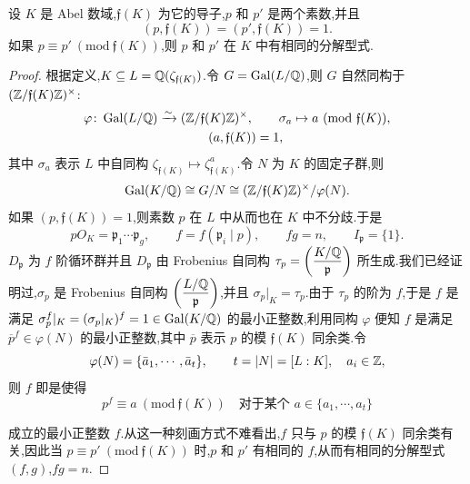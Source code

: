 \begin{theorem}\label{thm:2.18}
设 $K$ 是 Abel 数域,$\mathfrak{f}(K)$ 为它的导子,$p$ 和 $p'$ 是两个素数,并且
\[
  (p,\mathfrak{f}(K))=(p',\mathfrak{f}(K))=1.
\]
如果 $p\equiv p'\ (\mathrm{mod}\ \mathfrak{f}(K))$,则 $p$ 和 $p'$ 在 $K$ 中有相同的分解型式.
\end{theorem}

\begin{proof}
根据定义,$K\subseteq L=\mathbb{Q}(\zeta_{\mathfrak{f}(K)})$.令 $G=\operatorname{Gal}(L/\mathbb{Q})$,则 $G$ 自然同构于 $(\mathbb{Z}/\mathfrak{f}(K)\mathbb{Z})^\times$:
\begin{align*}
  \varphi\colon\operatorname{Gal}(L/\mathbb{Q})&\xrightarrow{\sim}(\mathbb{Z}/\mathfrak{f}(K)\mathbb{Z})^\times,\qquad
  \sigma_a\mapsto a\ (\mathrm{mod}\ \mathfrak{f}(K)),\\
  &\qquad\qquad (a,\mathfrak{f}(K))=1,
\end{align*}
其中 $\sigma_a$ 表示 $L$ 中自同构 $\zeta_{\mathfrak{f}(K)}\mapsto\zeta_{\mathfrak{f}(K)}^a$.令 $N$ 为 $K$ 的固定子群,则
\[
  \operatorname{Gal}(K/\mathbb{Q})\cong G/N\cong(\mathbb{Z}/\mathfrak{f}(K)\mathbb{Z})^\times/\varphi(N).
\]
如果 $(p,\mathfrak{f}(K))=1$,则素数 $p$ 在 $L$ 中从而也在 $K$ 中不分歧.于是
\[
  pO_K=\mathfrak{p}_1\cdots\mathfrak{p}_g,\qquad f=f(\mathfrak{p}_i\mid p),\qquad fg=n,\qquad I_{\mathfrak{p}}=\{1\}.
\]
$D_{\mathfrak{p}}$ 为 $f$ 阶循环群并且 $D_{\mathfrak{p}}$ 由 Frobenius 自同构 $\tau_p=\left(\dfrac{K/\mathbb{Q}}{\mathfrak{p}}\right)$ 所生成.我们已经证明过,$\sigma_p$ 是 Frobenius 自同构 $\left(\dfrac{L/\mathbb{Q}}{\mathfrak{p}}\right)$,并且 $\sigma_p|_K=\tau_p$.由于 $\tau_p$ 的阶为 $f$,于是 $f$ 是满足 $\sigma_p^f|_K=(\sigma_p|_K)^f=1\in\operatorname{Gal}(K/\mathbb{Q})$ 的最小正整数,利用同构 $\varphi$ 便知 $f$ 是满足 $\overline{p}^f\in\varphi(N)$ 的最小正整数,其中 $\overline{p}$ 表示 $p$ 的模 $\mathfrak{f}(K)$ 同余类.令
\[
  \varphi(N)=\{\bar{a}_1,\cdots,\bar{a}_t\},\qquad t=|N|=[L:K],\quad a_i\in\mathbb{Z},
\]
则 $f$ 即是使得
\[
  p^f\equiv a\ (\mathrm{mod}\ \mathfrak{f}(K))\quad \text{对于某个 }a\in\{a_1,\cdots,a_t\}
\]
\begin{sloppypar}
成立的最小正整数 $f$.从这一种刻画方式不难看出,$f$ 只与 $p$ 的模 $\mathfrak{f}(K)$ 同余类有关,因此当 $p\equiv p'\ (\mathrm{mod}\ \mathfrak{f}(K))$ 时,$p$ 和 $p'$ 有相同的 $f$,从而有相同的分解型式 $(f,g)$,$fg=n$.
\end{sloppypar}
\end{proof}

